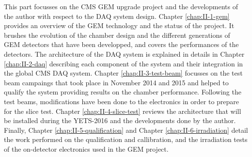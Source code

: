 This part focusses on the CMS GEM upgrade project and the developments of the author with respect to the DAQ system design. Chapter \ref{chap:II-1-gem} provides an overview of the GEM technology and the status of the project. It brushes the evolution of the chamber design and the different generations of GEM detectors that have been developped, and covers the performances of the detectors. The architecture of the DAQ system is explained in details in Chapter \ref{chap:II-2-daq} describing each component of the system and their integration in the global CMS DAQ system. Chapter \ref{chap:II-3-test-beam} focusses on the test beam campaings that took place in November 2014 and 2015 and helped to qualify the system providing results on the chamber performance. Following the test beams, modifications have been done to the electronics in order to prepare for the slice test. Chapter \ref{chap:II-4-slice-test} reviews the architecture that will be installed during the YETS-2016 and the developments done by the author. Finally, Chapter \ref{chap:II-5-qualification} and Chapter \ref{chap:II-6-irradiation} detail the work performed on the qualification and callibration, and the irradiation tests of the on-detector electronics used in the GEM project.
